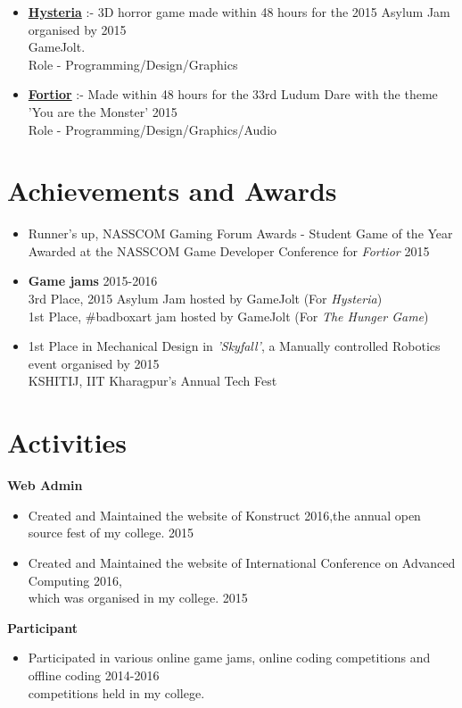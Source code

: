 \documentclass[margin, centered]{res}
\begin{document}
\begin{resume}
\begin{itemize}[leftmargin=*]
	\item \textbf{\href{http://gamejolt.com/games/hysteria/107191}{Hysteria}} :- 3D horror game made within 48 hours for the 2015 Asylum Jam organised by \hfill 2015 \\GameJolt. \\Role - Programming/Design/Graphics
	\item \textbf{\href{http://gamejolt.com/games/fortior/88093}{Fortior}} :- Made within 48 hours for the 33rd Ludum Dare with the theme 'You are the Monster' \hfill 2015
	\\Role - Programming/Design/Graphics/Audio
\end{itemize}

\section{Achievements and Awards}
\begin{itemize}[leftmargin=*]
\item Runner's up, NASSCOM Gaming Forum Awards - Student Game of the Year\\ 
Awarded at the NASSCOM Game Developer Conference for \textit{Fortior} \hfill 2015
\item \textbf{Game jams} \hfill 2015-2016
\\
3rd Place, 2015 Asylum Jam hosted by GameJolt (For \textit{Hysteria})\\
1st Place, \#badboxart jam hosted by GameJolt (For \textit{The Hunger Game})
\item 1st Place in Mechanical Design in \textit{'Skyfall'}, a Manually controlled Robotics event organised by \hfill2015 \\ KSHITIJ, IIT Kharagpur's Annual Tech Fest
\end{itemize}

\section{Activities}
\textbf{Web Admin}
\begin{itemize}[leftmargin=*]
\item Created and Maintained the website of Konstruct 2016,the  annual open source fest of my college. \hfill 2015
\item Created and Maintained the website of International Conference on Advanced Computing 2016,\\ which was organised in my college. \hfill 2015
\end{itemize} 
\textbf{Participant}
\begin{itemize}[leftmargin=*]
\item Participated in various online game jams, online coding competitions and offline coding \hfill 2014-2016 \\    competitions held in my college. 
\end{itemize}

\end{resume}
\end{document}
